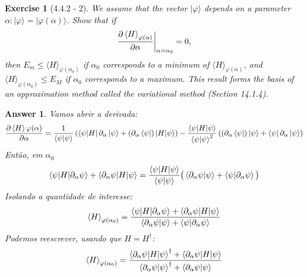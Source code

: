 \documentclass[12pt]{article}
\def\be{\begin{equation}}
\def\ee{\end{equation}}
\def\f{\frac}
\def\l{\left}
\def\r{\right}
\newtheorem{exercise}{Exercise}
\newtheorem{answer}{Answer}
\begin{document}
	\begin{exercise}[4.4.2 - 2]
		We assume that the vector $|\varphi\rangle$ depends on a parameter $\alpha:|\varphi\rangle=|\varphi(\alpha)\rangle$. Show that if
		\begin{equation}
			\frac{\partial\braket{H}_{\varphi(\alpha)}}{\partial \alpha}\bigg|_{\alpha=\alpha_0}=0,
		\end{equation}
		then $E_{m} \leq\langle H\rangle_{\varphi\left(\alpha_{0}\right)}$ if $\alpha_{0}$ corresponds to a minimum of $\langle H\rangle_{\varphi(\alpha)}$, and $\langle H\rangle_{\varphi\left(\alpha_{0}\right)} \leq E_{M}$ if $\alpha_{0}$ corresponds to a maximum. This result forms the basis of an approximation method called the variational method (Section 14.1.4).
	\end{exercise}
	\begin{answer}
		Vamos abrir a derivada:
		\be
			\frac{\partial\braket{H}{\varphi(\alpha)}}{\partial \alpha} = \f{1}{\braket{\psi|\psi}}\l( \bra{\psi|H} \partial_\alpha\ket{\psi} + (\partial_\alpha\bra{\psi})\ket{H|\psi}\r) - \f{\braket{\psi|H|\psi}}{\braket{\psi|\psi}^2}\l( (\partial_\alpha\bra{\psi})\ket{\psi} + \bra{\psi}\partial_\alpha\ket{\psi}\r) 
		\ee
		Então, em $\alpha_0$
		\be
			\braket{\psi|H|\partial_\alpha\psi} + \braket{\partial_\alpha\psi|H|\psi} = \f{\braket{\psi|H|\psi}}{\braket{\psi|\psi}}\big( \braket{\partial_\alpha\psi|\psi} + \braket{\psi|\partial_\alpha\psi}\big)
		\ee
		Isolando a quantidade de interesse:
		\be
			\braket{H}_{\varphi(\alpha_0)} = \f{\braket{\psi|H|\partial_\alpha\psi} + \braket{\partial_\alpha\psi|H|\psi}}{\braket{\partial_\alpha\psi|\psi} + \braket{\psi|\partial_\alpha\psi}}
		\ee 
		Podemos reescrever, usando que $H=H^\dagger$:
		\be
			\braket{H}_{\varphi(\alpha_0)} = \f{\braket{\partial_\alpha\psi|H|\psi}^\dagger + \braket{\partial_\alpha\psi|H|\psi}}{\braket{\partial_\alpha\psi|\psi}^\dagger + \braket{\partial_\alpha\psi|\psi}}
		\ee
		

\end{answer}
\end{document}

